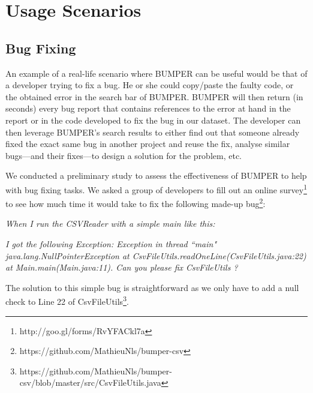 \documentclass[conference]{IEEEtran}
\begin{document}
\section{Usage Scenarios}

\subsection{Bug Fixing}
\label{subs:Bug Fixing}


An example of a real-life scenario where BUMPER can be useful would be that of a developer trying to fix a bug. He or she could copy/paste the faulty code, or the obtained error in the search bar of BUMPER. BUMPER will then return (in  seconds) every bug report that contains references to the error at hand in the report or in the code developed to fix the bug in our dataset. The developer can then leverage BUMPER’s search results to either find out that someone already fixed the exact same bug in another project and reuse the fix, analyse similar bugs—and their fixes—to design a solution for the problem, etc.

We conducted a preliminary study to assess the effectiveness of BUMPER to help with bug fixing tasks. We asked  a group of developers to fill out an online survey\footnote{http://goo.gl/forms/RvYFACkl7a} to see how much time it would take to fix the following made-up bug\footnote{https://github.com/MathieuNls/bumper-csv}:

\textit{When I run the CSVReader with a simple main like this:}

\noindent\begin{minipage}{0.90\linewidth}

 

\end{minipage}

\textit{I got the following Exception: Exception in thread ``main" java.lang.NullPointerException at CsvFileUtils.readOneLine(CsvFileUtils.java:22) at Main.main(Main.java:11). Can you please fix CsvFileUtils ?}


The solution to this simple bug is straightforward as we only have to add a null check to Line 22 of CsvFileUtils\footnote{https://github.com/MathieuNls/bumper-csv/blob/master/src/CsvFileUtils.java}.
\end{document}
